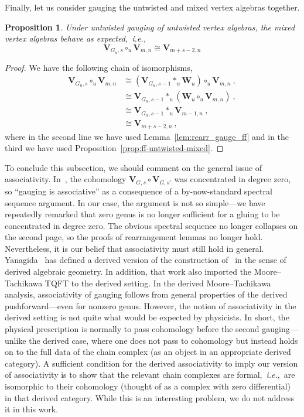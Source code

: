 \documentclass[a4paper]{article}
\newtheorem{prop}[thm]{Proposition}
\def \ie{{\it i.e.}}
\def\W{\mathbf{W}}
\def\V{\mathbf{V}}
\begin{document}
Finally, let us consider gauging the untwisted and mixed vertex algebras together.
\begin{prop}
Under untwisted gauging of untwisted vertex algebras, the mixed vertex algebras behave as expected,~\ie,
\begin{equation*}
\V_{G_u,s} \circ_u \V_{m,n} \cong \V_{m+s-2,n}
\end{equation*}
\end{prop}
\begin{proof}
We have the following chain of isomorphisms,
\begin{equation}\nonumber
	\begin{split}
	\V_{G_u,s}\circ_u\V_{m,n} &\cong (\V_{G_u,s-1}\ast_u \W_u)\circ_u \V_{m,n}~,\\
	&\cong \V_{G_u,s-1} \ast_u (\W_{u}\circ_u \V_{m,n})~,\\
	&\cong \V_{G_u,s-1} \ast_u \V_{m-1,n}~,\\
	&\cong \V_{m+s-2,n}~,
	\end{split}
\end{equation}
where in the second line we have used Lemma~\ref{lem:rearr_gauge_ff} and in the third we have used Proposition~\ref{prop:ff-untwisted-mixed}.
\end{proof}


To conclude this subsection, we should comment on the general issue of associativity. In~\cite{Arakawa:2018egx}, the cohomology $\V_{G,s}\circ\V_{G,s'}$ was concentrated in degree zero, so ``gauging is associative'' as a consequence of a by-now-standard spectral sequence argument. In our case, the argument is not so simple---we have repeatedly remarked that zero genus is no longer sufficient for a gluing to be concentrated in degree zero. The obvious spectral sequence no longer collapses on the second page, so the proofs of rearrangement lemmas no longer hold. Nevertheless, it is our belief that associativity must still hold in general. Yanagida~\cite{Yanagida:2020kim} has defined a derived version of the construction of~\cite{Arakawa:2018egx} in the sense of derived algebraic geometry. In addition, that work also imported the Moore--Tachikawa TQFT to the derived setting. In the derived Moore--Tachikawa analysis, associativity of gauging follows from general properties of the derived pushforward---even for nonzero genus. However, the notion of associativity in the derived setting is not quite what would be expected by physicists. In short, the physical prescription is normally to pass cohomology before the second gauging---unlike the derived case, where one does not pass to cohomology but instead holds on to the full data of the chain complex (as an object in an appropriate derived category). A sufficient condition for the derived associativity to imply our version of associativity is to show that the relevant chain complexes are formal,~\ie,~are isomorphic to their cohomology (thought of as a complex with zero differential) in that derived category. While this is an interesting problem, we do not address it in this work.
\end{document}
